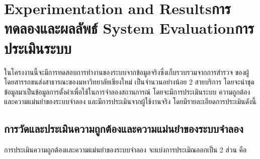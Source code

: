 \chapter{\ifproject%
\ifenglish Experimentation and Results\else การทดลองและผลลัพธ์\fi
\else%
\ifenglish System Evaluation\else การประเมินระบบ\fi
\fi}
\begin{mypara}
    \indent ในโครงงานนี้จะมีการทดสอบการทำงานของระบบจากข้อมูลจริงซึ่งเก็บรวบรวมจากการสำรวจ
    ของผู้โดยสารรถขนส่งสาธารณะของมหาวิทยาลัยเชียงใหม่ เป็นจำนวนอย่างน้อย 2 สายบริการ 
    โดยจะนำชุดข้อมูลมาเป็นข้อมูลการตั้งค่าเพื่อใช้ในการจำลองสถานการณ์ โดยจะมีการประเมินระบบ 
    ความถูกต้องและความแม่นยำของระบบจำลอง และมีการประเมินจากผู้ใช้งานจริง 
    โดยมีรายละเอียดการประเมินดังนี้
\end{mypara}


\section{การวัดและประเมินความถูกต้องและความแม่นยำของระบบจำลอง}
\begin{mypara}
    \indent การประเมินความถูกต้องและความแม่นยำของระบบจำลอง จะแบ่งการประเมิณออกเป็น 2 ส่วน คือ
\end{mypara}
